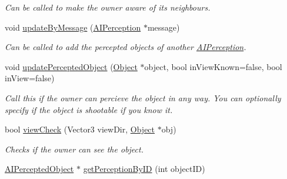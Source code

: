 \begin{DoxyCompactItemize}
\begin{DoxyCompactList}\small\item\em \-Can be called to make the owner aware of its neighbours. \end{DoxyCompactList}\item 
\hypertarget{classAIPerception_a3b03a2f17f3cce4bdd4d92edcc9ac2c5}{
void \hyperlink{classAIPerception_a3b03a2f17f3cce4bdd4d92edcc9ac2c5}{update\-By\-Message} (\hyperlink{classAIPerception}{\-A\-I\-Perception} $\ast$message)}
\label{d4/d0b/classAIPerception_a3b03a2f17f3cce4bdd4d92edcc9ac2c5}

\begin{DoxyCompactList}\small\item\em \-Can be called to add the percepted objects of another \hyperlink{classAIPerception}{\-A\-I\-Perception}. \end{DoxyCompactList}\item 
\hypertarget{classAIPerception_a1a589b0a4664ec9f51184c75e30b31a0}{
void \hyperlink{classAIPerception_a1a589b0a4664ec9f51184c75e30b31a0}{update\-Percepted\-Object} (\hyperlink{classObject}{\-Object} $\ast$object, bool in\-View\-Known=false, bool in\-View=false)}
\label{d4/d0b/classAIPerception_a1a589b0a4664ec9f51184c75e30b31a0}

\begin{DoxyCompactList}\small\item\em \-Call this if the owner can percieve the object in any way. \-You can optionally specify if the object is shootable if you know it. \end{DoxyCompactList}\item 
\hypertarget{classAIPerception_a6c85763901310b8a53c54b4e554f984b}{
bool \hyperlink{classAIPerception_a6c85763901310b8a53c54b4e554f984b}{view\-Check} (\-Vector3 view\-Dir, \hyperlink{classObject}{\-Object} $\ast$obj)}
\label{d4/d0b/classAIPerception_a6c85763901310b8a53c54b4e554f984b}

\begin{DoxyCompactList}\small\item\em \-Checks if the owner can see the object. \end{DoxyCompactList}\item 
\hypertarget{classAIPerception_a4b078bfc632269d90bd99b9eeef92056}{
\hyperlink{classAIPerceptedObject}{\-A\-I\-Percepted\-Object} $\ast$ \hyperlink{classAIPerception_a4b078bfc632269d90bd99b9eeef92056}{get\-Perception\-By\-I\-D} (int object\-I\-D)}
\label{d4/d0b/classAIPerception_a4b078bfc632269d90bd99b9eeef92056}


\end{DoxyCompactItemize}
